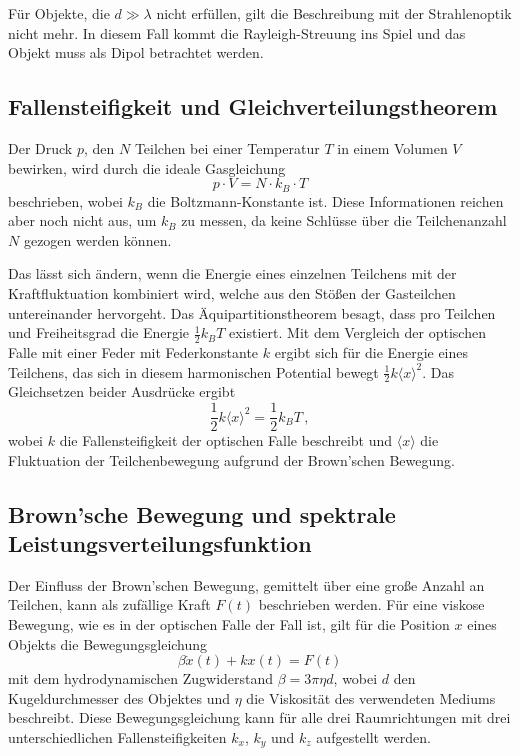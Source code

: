     Für Objekte, die $d\gg\lambda$ nicht erfüllen, gilt die Beschreibung mit der Strahlenoptik nicht mehr. In diesem Fall kommt die Rayleigh-Streuung ins Spiel und das Objekt muss als Dipol betrachtet werden. \cite{neumann}
  \subsection{Fallensteifigkeit und Gleichverteilungstheorem}
    Der Druck $p$, den $N$ Teilchen bei einer Temperatur $T$ in einem Volumen $V$ bewirken, wird durch die ideale Gasgleichung
    \begin{equation}
      p\cdot V = N\cdot k_B\cdot T
    \end{equation}
    beschrieben, wobei $k_B$ die Boltzmann-Konstante ist. Diese Informationen reichen aber noch nicht aus, um $k_B$ zu messen, da keine Schlüsse über die Teilchenanzahl $N$ gezogen werden können.

    Das lässt sich ändern, wenn die Energie eines einzelnen Teilchens mit der Kraftfluktuation kombiniert wird, welche aus den Stößen der Gasteilchen untereinander hervorgeht. Das Äquipartitionstheorem besagt, dass pro Teilchen und Freiheitsgrad die Energie $\frac{1}{2}k_BT$ existiert. Mit dem Vergleich der optischen Falle mit einer Feder mit Federkonstante $k$ ergibt sich für die Energie eines Teilchens, das sich in diesem harmonischen Potential bewegt $\frac{1}{2}k\langle x\rangle^2$. Das Gleichsetzen beider Ausdrücke ergibt
    \begin{equation}
      \frac{1}{2}k\langle x\rangle^2 = \frac{1}{2}k_BT \, ,
    \end{equation}
    wobei $k$ die Fallensteifigkeit der optischen Falle beschreibt und $\langle x\rangle$  die Fluktuation der Teilchenbewegung aufgrund der Brown'schen Bewegung.
  \subsection{Brown'sche Bewegung und spektrale Leistungsverteilungsfunktion}
    Der Einfluss der Brown'schen Bewegung, gemittelt über eine große Anzahl an Teilchen, kann als zufällige Kraft $F(t)$ beschrieben werden. Für eine viskose Bewegung, wie es in der optischen Falle der Fall ist, gilt für die Position $x$ eines Objekts die Bewegungsgleichung
    \begin{equation}
      \beta \dot{x}(t) + kx(t) = F(t)
    \end{equation}
    mit dem hydrodynamischen Zugwiderstand $\beta = 3\pi\eta d$, wobei $d$ den Kugeldurchmesser des Objektes und $\eta$ die Viskosität des verwendeten Mediums beschreibt. Diese Bewegungsgleichung kann für alle drei Raumrichtungen mit drei unterschiedlichen Fallensteifigkeiten $k_x$, $k_y$ und $k_z$ aufgestellt werden.

